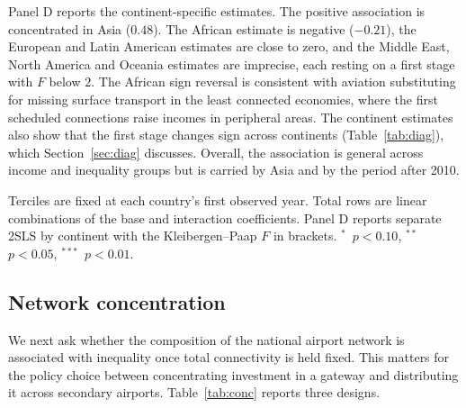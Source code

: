 \documentclass[12pt]{article}
\newcommand{\sym}[1]{\ensuremath{^{#1}}}
\begin{document}
Panel D reports the continent-specific estimates. The positive association is concentrated in Asia ($0.48$). The African estimate is negative ($-0.21$), the European and Latin American estimates are close to zero, and the Middle East, North America and Oceania estimates are imprecise, each resting on a first stage with $F$ below $2$. The African sign reversal is consistent with aviation substituting for missing surface transport in the least connected economies, where the first scheduled connections raise incomes in peripheral areas. The continent estimates also show that the first stage changes sign across continents (Table~\ref{tab:diag}), which Section~\ref{sec:diag} discusses. Overall, the association is general across income and inequality groups but is carried by Asia and by the period after 2010.

\begin{table}[H]\centering\caption{Heterogeneity: interaction 2SLS with the Feyrer instrument (robust SE).}\label{tab:hetero}
\begin{threeparttable}\small
\begin{tablenotes}\footnotesize\item Terciles are fixed at each country's first observed year. Total rows are linear combinations of the base and interaction coefficients. Panel D reports separate 2SLS by continent with the Kleibergen--Paap $F$ in brackets. \sym{*}~$p<0.10$, \sym{**}~$p<0.05$, \sym{***}~$p<0.01$.\end{tablenotes}\end{threeparttable}\end{table}

\subsection{Network concentration}
\label{sec:conc}
We next ask whether the composition of the national airport network is associated with inequality once total connectivity is held fixed. This matters for the policy choice between concentrating investment in a gateway and distributing it across secondary airports. Table~\ref{tab:conc} reports three designs.
\end{document}
